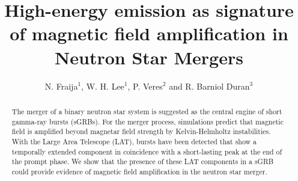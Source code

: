 \documentclass[11pt,twoside]{article}
\begin{document}
\vskip 1.0cm
\pagestyle{myheadings}

\vspace*{0.2cm}
\title{High-energy emission as signature of magnetic field amplification in Neutron Star Mergers}
\author{N. Fraija$^1$, W. H. Lee$^1$, P. Veres$^2$ and R. Barniol Duran$^3$}

\begin{abstract}
The merger of a binary neutron star system is suggested  as the central engine of short gamma-ray bursts (sGRBs).  For the merger process, simulations predict  that magnetic field is amplified beyond magnetar field strength  by Kelvin-Helmholtz instabilities.  With the Large Area Telescope (LAT), bursts have been detected that show a temporally extended component in coincidence with a short-lasting peak at the end of the prompt phase.  We show that the presence of these LAT components in a sGRB could provide evidence of magnetic field amplification in the neutron star merger.
%
\end{abstract}


\end{document}
